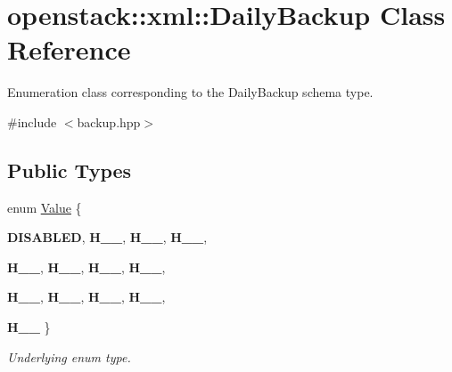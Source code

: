 \hypertarget{classopenstack_1_1xml_1_1DailyBackup}{
\section{openstack::xml::DailyBackup Class Reference}
\label{classopenstack_1_1xml_1_1DailyBackup}
}


Enumeration class corresponding to the DailyBackup schema type.  




{\ttfamily \#include $<$backup.hpp$>$}

\subsection*{Public Types}
\begin{DoxyCompactItemize}
\item 
enum \hyperlink{classopenstack_1_1xml_1_1DailyBackup_a61da52f27012e476ed49b709f9408add}{Value} \{ \par
{\bfseries DISABLED}, 
{\bfseries H\_\_}, 
{\bfseries H\_\_}, 
{\bfseries H\_\_}, 
\par
{\bfseries H\_\_}, 
{\bfseries H\_\_}, 
{\bfseries H\_\_}, 
{\bfseries H\_\_}, 
\par
{\bfseries H\_\_}, 
{\bfseries H\_\_}, 
{\bfseries H\_\_}, 
{\bfseries H\_\_}, 
\par
{\bfseries H\_\_}
 \}
\begin{DoxyCompactList}\small\item\em Underlying enum type. \item\end{DoxyCompactList}\end{DoxyCompactItemize}

